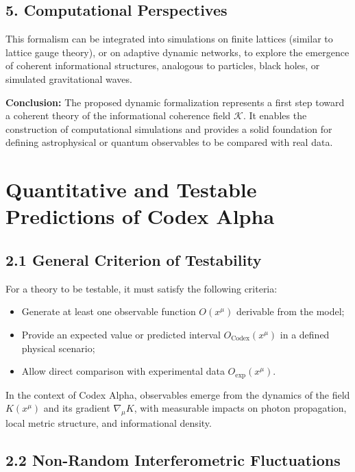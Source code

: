 \documentclass[12pt]{article}
\begin{document}
\subsection*{5. Computational Perspectives}

This formalism can be integrated into simulations on finite lattices (similar to lattice gauge theory), or on adaptive dynamic networks, to explore the emergence of coherent informational structures, analogous to particles, black holes, or simulated gravitational waves.

\bigskip

\textbf{Conclusion:} The proposed dynamic formalization represents a first step toward a coherent theory of the informational coherence field $\mathcal{K}$. It enables the construction of computational simulations and provides a solid foundation for defining astrophysical or quantum observables to be compared with real data.

\section*{Quantitative and Testable Predictions of Codex Alpha}

\subsection*{2.1 General Criterion of Testability}

For a theory to be testable, it must satisfy the following criteria:
\begin{itemize}
    \item Generate at least one observable function $O(x^\mu)$ derivable from the model;
    \item Provide an expected value or predicted interval $O_{\text{Codex}}(x^\mu)$ in a defined physical scenario;
    \item Allow direct comparison with experimental data $O_{\text{exp}}(x^\mu)$.
\end{itemize}
In the context of Codex Alpha, observables emerge from the dynamics of the field $K(x^\mu)$ and its gradient $\nabla_\mu K$, with measurable impacts on photon propagation, local metric structure, and informational density.

\subsection*{2.2 Non-Random Interferometric Fluctuations}
\end{document}
